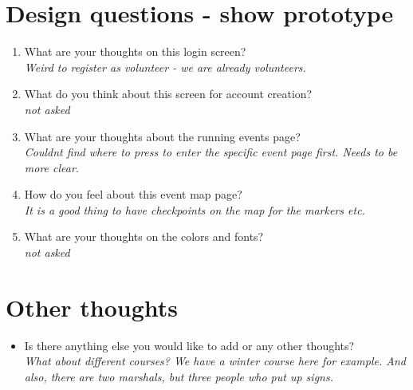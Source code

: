 \documentclass{article}
\begin{document}
\newpage
\section*{Design questions - show prototype}
\begin{enumerate}[label=\textbf{Question \arabic*:}]
    \item What are your thoughts on this login screen?\\
        \textit{Weird to register as volunteer - we are already volunteers.}
    \item What do you think about this screen for account creation?\\
        \textit{not asked}
    \item What are your thoughts about the running events page?\\
        \textit{Couldnt find where to press to enter the specific event page first. Needs to be more clear. }
    \item How do you feel about this event map page?\\
        \textit{It is a good thing to have checkpoints on the map for the markers etc.}
    \item What are your thoughts on the colors and fonts?\\
        \textit{not asked}
\end{enumerate}

\section*{Other thoughts}
\begin{itemize}[label=]
    \item Is there anything else you would like to add or any other thoughts?\\
    \textit{What about different courses? We have a winter course here for example. And also, there are two marshals, but three people who put up signs.}
\end{itemize}
\thispagestyle{empty}
\end{document}
